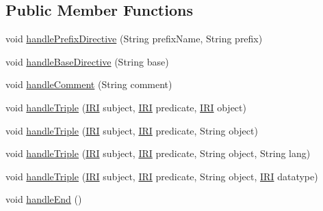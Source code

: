 \subsection*{Public Member Functions}
\begin{DoxyCompactItemize}
\item 
void \hyperlink{interfaceuk_1_1ac_1_1manchester_1_1cs_1_1owl_1_1owlapi_1_1turtle_1_1parser_1_1_triple_handler_a0aa677a625a9c75770eeb69e1e934e76}{handle\-Prefix\-Directive} (String prefix\-Name, String prefix)
\item 
void \hyperlink{interfaceuk_1_1ac_1_1manchester_1_1cs_1_1owl_1_1owlapi_1_1turtle_1_1parser_1_1_triple_handler_abf8bdf53cb277f817ca8362004002ca8}{handle\-Base\-Directive} (String base)
\item 
void \hyperlink{interfaceuk_1_1ac_1_1manchester_1_1cs_1_1owl_1_1owlapi_1_1turtle_1_1parser_1_1_triple_handler_a25d9c8d49dd1011f5da0849a68fe404c}{handle\-Comment} (String comment)
\item 
void \hyperlink{interfaceuk_1_1ac_1_1manchester_1_1cs_1_1owl_1_1owlapi_1_1turtle_1_1parser_1_1_triple_handler_a3568a46fea27142e4f8f3b1890b16af4}{handle\-Triple} (\hyperlink{classorg_1_1semanticweb_1_1owlapi_1_1model_1_1_i_r_i}{I\-R\-I} subject, \hyperlink{classorg_1_1semanticweb_1_1owlapi_1_1model_1_1_i_r_i}{I\-R\-I} predicate, \hyperlink{classorg_1_1semanticweb_1_1owlapi_1_1model_1_1_i_r_i}{I\-R\-I} object)
\item 
void \hyperlink{interfaceuk_1_1ac_1_1manchester_1_1cs_1_1owl_1_1owlapi_1_1turtle_1_1parser_1_1_triple_handler_a6ace578043e9d9c40917e76465320e1b}{handle\-Triple} (\hyperlink{classorg_1_1semanticweb_1_1owlapi_1_1model_1_1_i_r_i}{I\-R\-I} subject, \hyperlink{classorg_1_1semanticweb_1_1owlapi_1_1model_1_1_i_r_i}{I\-R\-I} predicate, String object)
\item 
void \hyperlink{interfaceuk_1_1ac_1_1manchester_1_1cs_1_1owl_1_1owlapi_1_1turtle_1_1parser_1_1_triple_handler_ae157209f0b7cdb40951e6a4fb8f1f033}{handle\-Triple} (\hyperlink{classorg_1_1semanticweb_1_1owlapi_1_1model_1_1_i_r_i}{I\-R\-I} subject, \hyperlink{classorg_1_1semanticweb_1_1owlapi_1_1model_1_1_i_r_i}{I\-R\-I} predicate, String object, String lang)
\item 
void \hyperlink{interfaceuk_1_1ac_1_1manchester_1_1cs_1_1owl_1_1owlapi_1_1turtle_1_1parser_1_1_triple_handler_a1c42f55ea649a074298aed5f18e14d8d}{handle\-Triple} (\hyperlink{classorg_1_1semanticweb_1_1owlapi_1_1model_1_1_i_r_i}{I\-R\-I} subject, \hyperlink{classorg_1_1semanticweb_1_1owlapi_1_1model_1_1_i_r_i}{I\-R\-I} predicate, String object, \hyperlink{classorg_1_1semanticweb_1_1owlapi_1_1model_1_1_i_r_i}{I\-R\-I} datatype)
\item 
void \hyperlink{interfaceuk_1_1ac_1_1manchester_1_1cs_1_1owl_1_1owlapi_1_1turtle_1_1parser_1_1_triple_handler_a701091aa616f289510945b3d0e7c5729}{handle\-End} ()
\end{DoxyCompactItemize}


